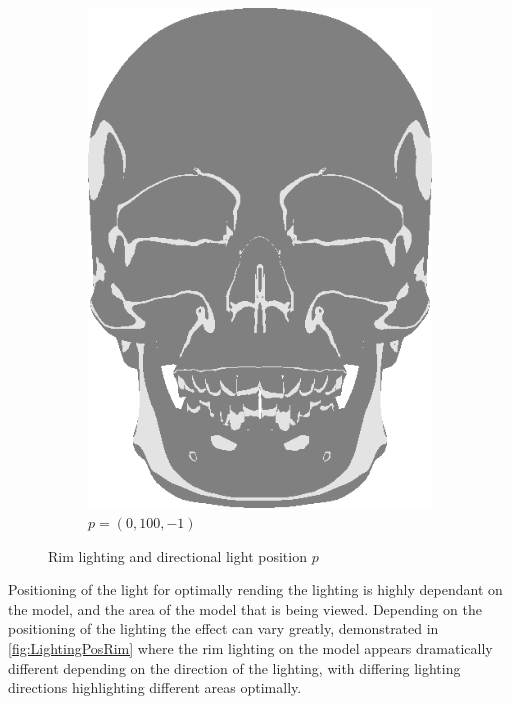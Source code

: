 \begin{figure}[h]
\begin{subfigure}[b]{0.22\textwidth}
        \includegraphics[width=\textwidth]{img/Lighting/Directional(100,-1).png}
        \caption{$p = (0,100,-1)$}
        \label{fig:LightingPosDir3}
    \end{subfigure}
\caption{Rim lighting and directional light position $p$}
 \label{fig:LightingPosRim}
 \end{figure}
 
Positioning of the light for optimally rending the lighting is highly dependant on the model, and the area of 
the model that is being viewed. Depending on the positioning of the lighting the effect can vary greatly, 
demonstrated in \autoref{fig:LightingPosRim} where the rim lighting on the model appears dramatically different 
depending on the direction of the lighting, with differing lighting directions highlighting different areas optimally.
 

